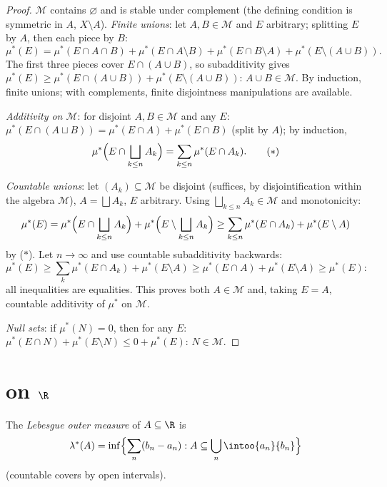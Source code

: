 \begin{proof}
$\mathcal M$ contains $\varnothing$ and is stable under
complement (the defining condition is symmetric in $A$,
$X\setminus A$). \emph{Finite unions}: let $A, B \in \mathcal
M$ and $E$ arbitrary; splitting $E$ by $A$, then each piece by
$B$:
\[
\mu^*(E) = \mu^*(E\cap A\cap B) + \mu^*(E\cap A\setminus B) +
\mu^*(E\cap B\setminus A) + \mu^*(E\setminus(A\cup B)).
\]
The first three pieces cover $E \cap (A \cup B)$, so
subadditivity gives $\mu^*(E) \geq \mu^*(E\cap(A\cup B)) +
\mu^*(E\setminus(A\cup B))$: $A \cup B \in \mathcal M$. By
induction, finite unions; with complements, finite disjointness
manipulations are available.

\emph{Additivity on $\mathcal M$}: for disjoint $A, B \in
\mathcal M$ and any $E$: $\mu^*(E\cap(A\sqcup B)) = \mu^*(E\cap
A) + \mu^*(E \cap B)$ (split by $A$); by induction,
\[
\mu^*\Bigl(E \cap \bigsqcup_{k\leq n}A_k\Bigr)
= \sum_{k\leq n}\mu^*(E\cap A_k).
\tag{$*$}
\]

\emph{Countable unions}: let $(A_k) \subseteq \mathcal M$ be
disjoint (suffices, by disjointification within the algebra
$\mathcal M$), $A = \bigsqcup A_k$, $E$ arbitrary. Using
$\bigsqcup_{k\leq n}A_k \in \mathcal M$ and monotonicity:
\[
\mu^*(E) = \mu^*\Bigl(E\cap\bigsqcup_{k\leq n}A_k\Bigr) +
\mu^*\Bigl(E\setminus\bigsqcup_{k\leq n}A_k\Bigr)
\geq \sum_{k \leq n}\mu^*(E\cap A_k) + \mu^*(E\setminus A)
\]
by ($*$). Let $n \to \infty$ and use countable subadditivity
backwards:
\[
\mu^*(E) \geq \sum_{k}\mu^*(E\cap A_k) + \mu^*(E\setminus A)
\geq \mu^*(E \cap A) + \mu^*(E\setminus A) \geq \mu^*(E):
\]
all inequalities are equalities. This proves both $A \in
\mathcal M$ and, taking $E = A$, countable additivity of
$\mu^*$ on $\mathcal M$.

\emph{Null sets}: if $\mu^*(N) = 0$, then for any $E$:
$\mu^*(E \cap N) + \mu^*(E\setminus N) \leq 0 + \mu^*(E)$:
$N \in \mathcal M$.
\end{proof}

\section{ on \texorpdfstring{$\R$}{R}}

\begin{definition}\label{def:b3:measure:lebesgueouter}
The \emph{Lebesgue outer measure} of $A
\subseteq \R$ is
\[
\lambda^*(A) = \inf\Bigl\{\sum_{n} (b_n - a_n) :
A \subseteq \bigcup_n \intoo{a_n}{b_n}\Bigr\}
\]
(countable covers by open intervals).
\end{definition}

